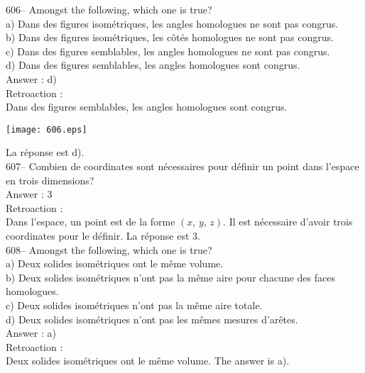 ﻿\documentclass[letterpaper, 12pt]{article}
\begin{document}
606-- Amongst the following, which one is true?\\
a) Dans des figures isom\'etriques, les angles homologues ne sont pas
congrus.\\
b) Dans des figures isom\'etriques, les c\^ot\'es homologues ne sont pas
congrus.\\
c) Dans des figures semblables, les angles homologues ne sont pas congrus.\\
d) Dans des figures semblables, les angles homologues sont congrus.\\

Answer : d)\\

Retroaction : \\
Dans des figures semblables, les angles homologues sont congrus.
\begin{center}
    \texttt{[image: 606.eps]}
    \end{center}  La
r\'eponse est d).\\

607-- Combien de coordinates sont n\'ecessaires pour d\'efinir un point
dans l'espace en trois dimensions?\\

Answer : 3\\

Retroaction : \\
Dans l'espace, un point est de la forme $\left(x,\,y,\,z\right) $.  Il est
n\'ecessaire d'avoir trois coordinates pour le d\'efinir.  La r\'eponse
est 3.\\

608-- Amongst the following, which one is true?\\
a) Deux solides isom\'etriques ont le m\^eme volume.\\
b) Deux solides isom\'etriques n'ont pas la m\^eme aire pour chacune des
faces homologues.\\
c) Deux solides isom\'etriques n'ont pas la m\^eme aire totale.\\
d) Deux solides isom\'etriques n'ont pas les m\^emes mesures d'ar\^etes.\\


Answer : a)\\

Retroaction : \\
Deux solides isom\'etriques ont le m\^eme volume.  The answer is a).\\
\end{document}

